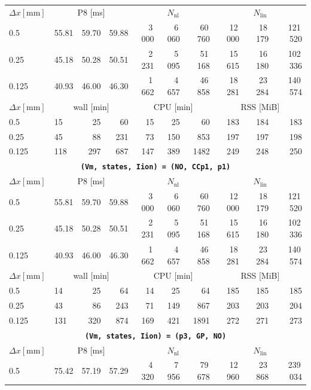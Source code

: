 \documentclass[11pt,a4paper]{article}
\newcommand{\code}[1]{\texttt{\small #1}}
\begin{document}
\begin{center}
\begin{longtable}{l|lrr|rrr|rrr}
$ \Delta x [\text{mm}] $ & \multicolumn{3}{c|}{P8 [ms]} & \multicolumn{3}{c|}{$N_{\mathrm{nl}}$} & \multicolumn{3}{c|}{$N_{\mathrm{lin}}$}\\
0.5 & 55.81 & 59.70 & 59.88 & 3\,000 & 6\,060 & 60\,760 & 12\,000 & 18\,179 & 121\,520\\
0.25 & 45.18 & 50.28 & 50.51 & 2\,231 & 5\,095 & 51\,168 & 15\,615 & 16\,180 & 102\,336\\
0.125 & 40.93 & 46.00 & 46.30 & 1\,662 & 4\,657 & 46\,858 & 18\,281 & 23\,284 & 140\,574\\
\hline
$ \Delta x [\text{mm}] $ & \multicolumn{3}{c|}{wall [min]} & \multicolumn{3}{c|}{CPU [min]} & \multicolumn{3}{c|}{RSS [MiB]}\\
0.5 & 15 & 25 & 60 & 15 & 25 & 60 & 183 & 184 & 183\\
0.25 & 45 & 88 & 231 & 73 & 150 & 853 & 197 & 197 & 198\\
0.125 & 118 & 297 & 687 & 147 & 389 & 1482 & 249 & 248 & 250\\
\hline
\hline
\multicolumn{10}{c}{\textbf{\code{(Vm, states, Iion) = (NO, CCp1, p1)}}}\\\hline
$ \Delta x [\text{mm}] $ & \multicolumn{3}{c|}{P8 [ms]} & \multicolumn{3}{c|}{$N_{\mathrm{nl}}$} & \multicolumn{3}{c|}{$N_{\mathrm{lin}}$}\\
0.5 & 55.81 & 59.70 & 59.88 & 3\,000 & 6\,060 & 60\,760 & 12\,000 & 18\,179 & 121\,520\\
0.25 & 45.18 & 50.28 & 50.51 & 2\,231 & 5\,095 & 51\,168 & 15\,615 & 16\,180 & 102\,336\\
0.125 & 40.93 & 46.00 & 46.30 & 1\,662 & 4\,657 & 46\,858 & 18\,281 & 23\,284 & 140\,574\\
\hline
$ \Delta x [\text{mm}] $ & \multicolumn{3}{c|}{wall [min]} & \multicolumn{3}{c|}{CPU [min]} & \multicolumn{3}{c|}{RSS [MiB]}\\
0.5 & 14 & 25 & 64 & 14 & 25 & 64 & 185 & 185 & 185\\
0.25 & 43 & 86 & 243 & 71 & 149 & 867 & 203 & 203 & 204\\
0.125 & 131 & 320 & 874 & 169 & 421 & 1891 & 272 & 271 & 273\\
\hline
\hline
\multicolumn{10}{c}{\textbf{\code{(Vm, states, Iion) = (p3, GP, NO)}}}\\\hline
$ \Delta x [\text{mm}] $ & \multicolumn{3}{c|}{P8 [ms]} & \multicolumn{3}{c|}{$N_{\mathrm{nl}}$} & \multicolumn{3}{c|}{$N_{\mathrm{lin}}$}\\
0.5 & 75.42 & 57.19 & 57.29 & 4\,320 & 7\,956 & 79\,678 & 12\,960 & 23\,868 & 239\,034\\

\end{longtable}
\end{center}
\end{document}
